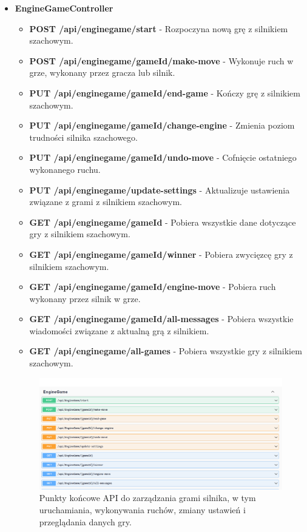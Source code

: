 \documentclass[12pt,a4paper]{article}
\begin{document}
\begin{itemize}
    \item \textbf{EngineGameController}
    \begin{itemize} 
        \item \textbf{POST /api/enginegame/start} - Rozpoczyna nową grę z silnikiem szachowym. 
        \item \textbf{POST /api/enginegame/{gameId}/make-move} - Wykonuje ruch w grze, wykonany przez gracza lub silnik.
        \item \textbf{PUT /api/enginegame/{gameId}/end-game} - Kończy grę z silnikiem szachowym. 
        \item \textbf{PUT /api/enginegame/{gameId}/change-engine} - Zmienia poziom trudności silnika szachowego. 
        \item \textbf{PUT /api/enginegame/{gameId}/undo-move} - Cofnięcie ostatniego wykonanego ruchu. 
        \item \textbf{PUT /api/enginegame/update-settings} - Aktualizuje ustawienia związane z grami z silnikiem szachowym. 
        \item \textbf{GET /api/enginegame/{gameId}} - Pobiera wszystkie dane dotyczące gry z silnikiem szachowym.
        \item \textbf{GET /api/enginegame/{gameId}/winner} - Pobiera zwycięzcę gry z silnikiem szachowym. 
        \item \textbf{GET /api/enginegame/{gameId}/engine-move} - Pobiera ruch wykonany przez silnik w grze. 
        \item \textbf{GET /api/enginegame/{gameId}/all-messages} - Pobiera wszystkie wiadomości związane z aktualną grą z silnikiem. 
        \item \textbf{GET /api/enginegame/all-games} - Pobiera wszystkie gry z silnikiem szachowym. 
    \end{itemize}
    \begin{figure}[h!]
        \centering
        \includegraphics[width=1\textwidth]{zdj/enginegame_controller.png}
        \caption{Punkty końcowe API do zarządzania grami silnika, w tym uruchamiania, wykonywania ruchów, zmiany ustawień i przeglądania danych gry.}
        
    \end{figure}
\end{itemize}
\end{document}
